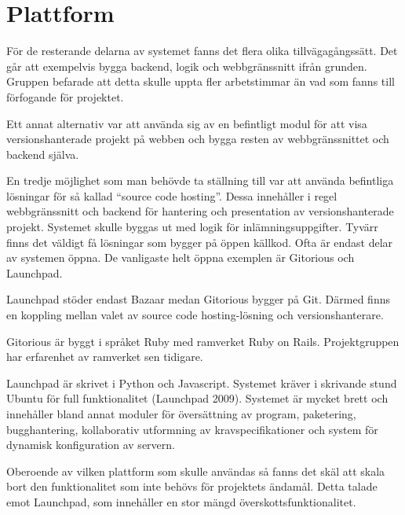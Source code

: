 \section{Plattform}
För de resterande delarna av systemet fanns det flera olika tillvägagångssätt. Det går att exempelvis bygga backend, logik och webbgränssnitt ifrån grunden. Gruppen befarade att detta skulle uppta fler arbetstimmar än vad som fanns till förfogande för projektet.

Ett annat alternativ var att använda sig av en befintligt modul för att visa versionshanterade projekt på webben och bygga resten av webbgränssnittet och backend själva.

En tredje möjlighet som man behövde ta ställning till var att använda befintliga lösningar för så kallad “source code hosting”. Dessa innehåller i regel webbgränssnitt och backend för hantering och presentation av versionshanterade projekt. Systemet skulle byggas ut med logik för inlämningsuppgifter. Tyvärr finns det väldigt få lösningar som bygger på öppen källkod. Ofta är endast delar av systemen öppna. De vanligaste helt öppna exemplen är Gitorious och Launchpad.

Launchpad stöder endast Bazaar medan Gitorious bygger på Git. Därmed finns en koppling mellan valet av source code hosting-lösning och versionshanterare.

Gitorious är byggt i språket Ruby med ramverket Ruby on Rails. Projektgruppen har erfarenhet av ramverket sen tidigare. 

Launchpad är skrivet i Python och Javascript. Systemet kräver i skrivande stund Ubuntu för full funktionalitet (Launchpad 2009). Systemet är mycket brett och innehåller bland annat moduler för översättning av program, paketering, bugghantering, kollaborativ utformning av kravspecifikationer och system för dynamisk konfiguration av servern.

Oberoende av vilken plattform som skulle användas så fanns det skäl att skala bort den funktionalitet som inte behövs för projektets ändamål. Detta talade emot Launchpad, som innehåller en stor mängd överskottsfunktionalitet.
